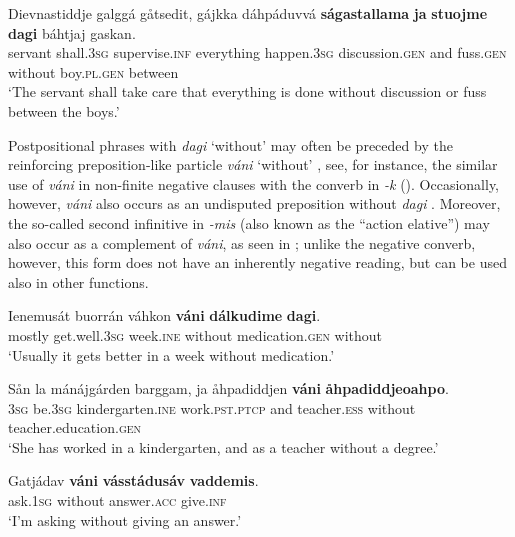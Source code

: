 \documentclass[output=paper,colorlinks,citecolor=brown]{langscibook}
\begin{document}
\ea\label{ex:lul:42} 
    \gll Dievnastiddje galggá gåtsedit, gájkka dáhpáduvvá  \textbf{ságastallama} \textbf{ja} \textbf{stuojme} \textbf{dagi} báhtjaj gaskan.\\ 
         servant shall.\textsc{3sg} supervise.\textsc{inf} everything happen.\textsc{3sg} discussion.\textsc{gen} and fuss.\textsc{gen} without boy.\textsc{pl.gen} between \\
    \glt ‘The servant shall take care that everything is done without discussion or fuss between the boys.’ \citep{SIKOR2021}
\z 

Postpositional phrases with \textit{dagi} ‘without’ may often be preceded by the reinforcing preposition-like particle \textit{váni} ‘without’ , see, for instance, the similar use of \textit{váni} in non-finite negative clauses with the converb in \textit{-k} ().
Occasionally, however, \textit{váni} also occurs as an undisputed preposition without \textit{dagi} . Moreover, the so-called second infinitive in \textit{{}-mis} (also known as the ``action elative'') may also occur as a complement of \textit{váni}, as seen in ; unlike the negative converb, however, this form does not have an inherently negative reading, but can be used also in other functions.

\ea\label{ex:lul:43} 
    \gll Ienemusát buorrán váhkon \textbf{váni} \textbf{dálkudime} \textbf{dagi}. \\ 
         mostly get.well\textsc{.3sg} week.\textsc{ine} without medication.\textsc{gen} without \\
    \glt ‘Usually it gets better in a week without medication.’ \citep{SIKOR2021}
\z 
 
\ea\label{ex:lul:44} 
    \gll Sån la mánájgárden barggam, ja åhpadiddjen \textbf{váni} \textbf{åhpadiddjeoahpo}.\\ 
         \textsc{3sg} be.\textsc{3sg} kindergarten.\textsc{ine} work.\textsc{pst.ptcp} and teacher.\textsc{ess} without teacher.education.\textsc{gen}\\
    \glt ‘She has worked in a kindergarten, and as a teacher without a degree.’ \citep{SIKOR2021}
\z 

\ea\label{ex:lul:45} 
    \gll Gatjádav \textbf{váni} \textbf{vásstádusáv} \textbf{vaddemis}. \\ 
         ask.\textsc{1sg} without answer.\textsc{acc} give.\textsc{inf} \\
    \glt ‘I’m asking without giving an answer.’ \citep{SIKOR2021}
\z 
\end{document}

